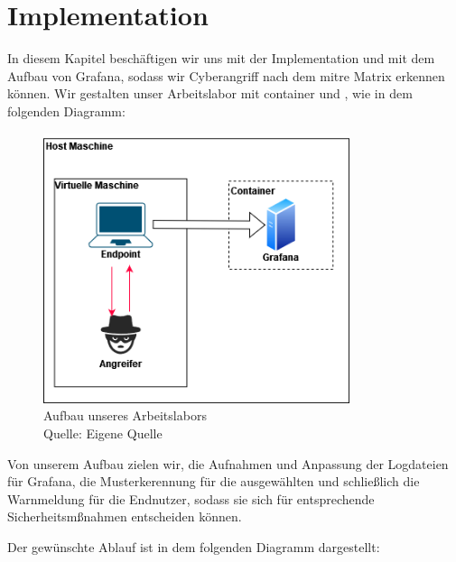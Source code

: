\section{Implementation}
In diesem Kapitel beschäftigen wir uns mit der Implementation und mit dem Aufbau von Grafana, sodass wir \gls{Cyberangriff} nach dem \gls{mitre} Matrix erkennen können. Wir gestalten unser Arbeitslabor mit \gls{container} und , wie in dem folgenden Diagramm:

\begin{figure}[H]
   \centering
   \includegraphics[width=0.8\textwidth]{assets/Arbeitslabor.drawio.png}
   \caption{Aufbau unseres Arbeitslabors \\Quelle: Eigene Quelle}
   \centering
\end{figure}

Von unserem Aufbau zielen wir, die Aufnahmen und Anpassung der Logdateien für Grafana, die Musterkerennung für die ausgewählten  und schließlich die Warnmeldung für die Endnutzer, sodass sie sich für entsprechende Sicherheitsmßnahmen entscheiden können. 

\newpage
Der gewünschte Ablauf ist in dem folgenden Diagramm dargestellt:

